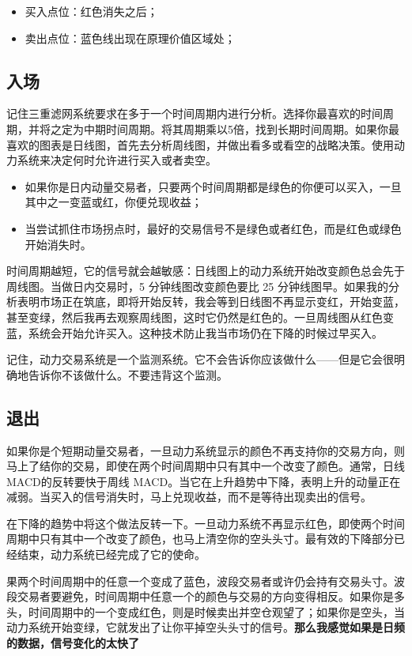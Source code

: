 \begin{itemize}
    \item 买入点位：红色消失之后；
    \item 卖出点位：蓝色线出现在原理价值区域处；
\end{itemize}

\subsection*{入场}
记住三重滤网系统要求在多于一个时间周期内进行分析。选择你最喜欢的时间周期，并将之定为中期时间周期。将其周期乘以5倍，找到长期时间周期。如果你最喜欢的图表是日线图，首先去分析周线图，并做出看多或看空的战略决策。使用动力系统来决定何时允许进行买入或者卖空。
\begin{itemize}
    \item 如果你是日内动量交易者，只要两个时间周期都是绿色的你便可以买入，一旦其中之一变蓝或红，你便兑现收益；
    \item 当尝试抓住市场拐点时，最好的交易信号不是绿色或者红色，而是红色或绿色开始消失时。
\end{itemize}

时间周期越短，它的信号就会越敏感：日线图上的动力系统开始改变颜色总会先于周线图。当做日内交易时，5 分钟线图改变颜色要比 25 分钟线图早。如果我的分析表明市场正在筑底，即将开始反转，我会等到日线图不再显示变红，开始变蓝，甚至变绿，然后我再去观察周线图，这时它仍然是红色的。一旦周线图从红色变蓝，系统会开始允许买入。这种技术防止我当市场仍在下降的时候过早买入。

记住，动力交易系统是一个监测系统。它不会告诉你应该做什么——但是它会很明确地告诉你不该做什么。不要违背这个监测。
\subsection*{退出}
如果你是个短期动量交易者，一旦动力系统显示的颜色不再支持你的交易方向，则马上了结你的交易，即使在两个时间周期中只有其中一个改变了颜色。通常，日线MACD的反转要快于周线 MACD。当它在上升趋势中下降，表明上升的动量正在减弱。当买入的信号消失时，马上兑现收益，而不是等待出现卖出的信号。

在下降的趋势中将这个做法反转一下。一旦动力系统不再显示红色，即使两个时间周期中只有其中一个改变了颜色，也马上清空你的空头头寸。最有效的下降部分已经结束，动力系统已经完成了它的使命。

果两个时间周期中的任意一个变成了蓝色，波段交易者或许仍会持有交易头寸。波段交易者要避免，时间周期中任意一个的颜色与交易的方向变得相反。如果你是多头，时间周期中的一个变成红色，则是时候卖出并空仓观望了；如果你是空头，当动力系统开始变绿，它就发出了让你平掉空头头寸的信号。\textbf{那么我感觉如果是日频的数据，信号变化的太快了}
